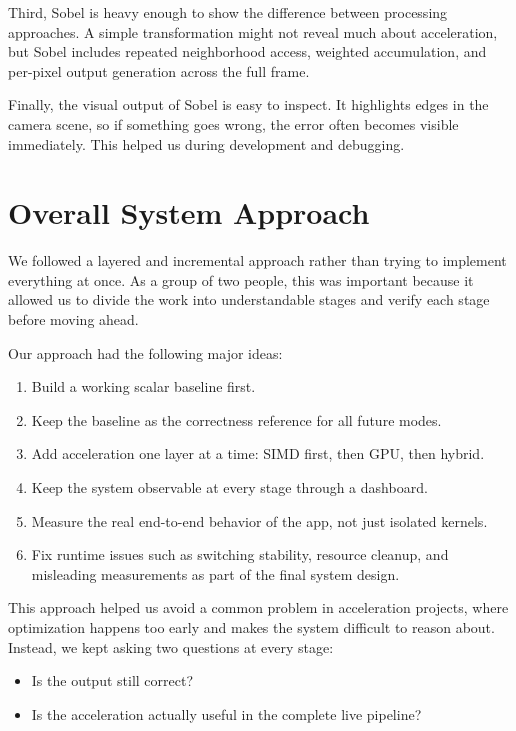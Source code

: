 \documentclass[12pt,a4paper]{article}
\begin{document}
Third, Sobel is heavy enough to show the difference between processing approaches. A simple transformation might not reveal much about acceleration, but Sobel includes repeated neighborhood access, weighted accumulation, and per-pixel output generation across the full frame.

Finally, the visual output of Sobel is easy to inspect. It highlights edges in the camera scene, so if something goes wrong, the error often becomes visible immediately. This helped us during development and debugging.

\section{Overall System Approach}

We followed a layered and incremental approach rather than trying to implement everything at once. As a group of two people, this was important because it allowed us to divide the work into understandable stages and verify each stage before moving ahead.

Our approach had the following major ideas:

\begin{enumerate}
\item Build a working scalar baseline first.
\item Keep the baseline as the correctness reference for all future modes.
\item Add acceleration one layer at a time: SIMD first, then GPU, then hybrid.
\item Keep the system observable at every stage through a dashboard.
\item Measure the real end-to-end behavior of the app, not just isolated kernels.
\item Fix runtime issues such as switching stability, resource cleanup, and misleading measurements as part of the final system design.
\end{enumerate}

This approach helped us avoid a common problem in acceleration projects, where optimization happens too early and makes the system difficult to reason about. Instead, we kept asking two questions at every stage:

\begin{itemize}
\item Is the output still correct?
\item Is the acceleration actually useful in the complete live pipeline?
\end{itemize}
\end{document}
